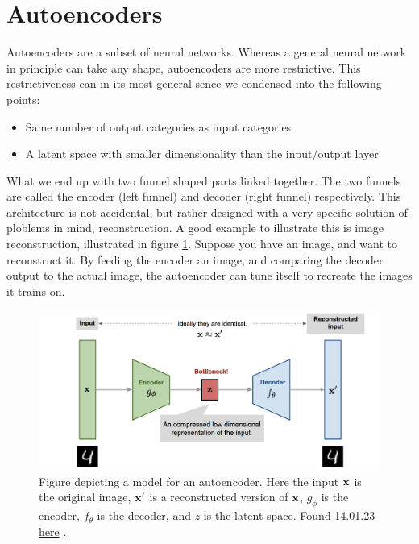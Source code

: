 \section{Autoencoders}
Autoencoders are a subset of neural networks. Whereas a general neural network
 in principle can take any shape, autoencoders are more restrictive.
This restrictiveness can in its most general sence we condensed 
into the following points:
\begin{itemize}
    \item Same number of output categories as input categories  
    \item A latent space with smaller dimensionality than the input/output layer  
\end{itemize}
What we end up with two funnel shaped parts linked together. The two funnels are 
called the encoder (left funnel) and decoder (right funnel) respectively. This architecture is not 
accidental, but rather designed with a very specific solution of ploblems in mind, reconstruction. 
A good example to illustrate this is image reconstruction, illustrated in figure \ref{fig:ae_denoise}. 
Suppose you have an image, and want to reconstruct it. By feeding the encoder an image, 
and comparing the decoder output to the actual image, the autoencoder can tune itself to recreate the images it trains on. 

\begin{figure}[h!]
    \includegraphics[width=\linewidth]{Figures/Machinelearning/autoencoder_imagedenoising.png}
    \caption{Figure depicting a model for an autoencoder. Here the input $\bf{x}$ is the original image, $\bf{x'}$ is a reconstructed version of $\bf{x}$, $g_{\phi}$ is the encoder, $f_{\theta}$ is the decoder, and $z$ is the latent space. Found 14.01.23 \href{https://lilianweng.github.io/posts/2018-08-12-vae/autoencoder-architecture.png}{here} \cite{weng2018VAE}. }
    \label{fig:ae_denoise}
\end{figure}

